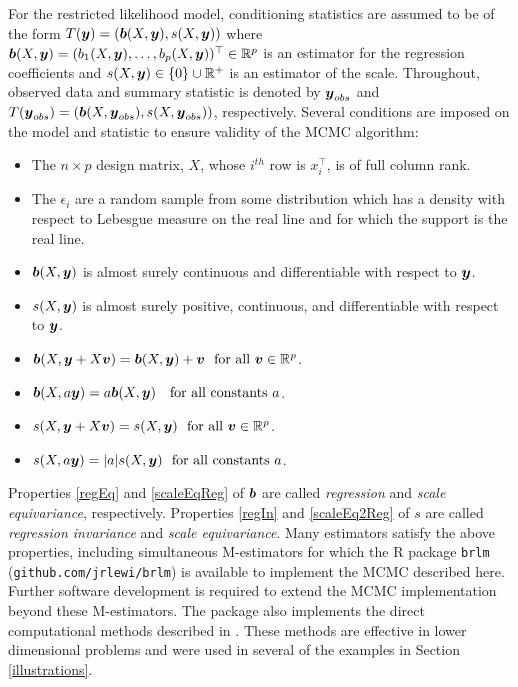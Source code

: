 \documentclass[ba]{imsart}
\makeatletter
\newcommand{\by}{\mbox{\boldmath $y$}}
\newcommand{\bv}{\mbox{\boldmath $v$}}
\newcommand{\bb}{\mbox{\boldmath $b$}}
\newcommand{\green}[1]{{\color{green}#1}}
\newcommand{\labitem}[2]{%
\def\@itemlabel{\textbf{#1}{.}}
\item
\def\@currentlabel{#1}\label{#2}}
\makeatother
\begin{document}
For the restricted likelihood model,  conditioning statistics are assumed to be of the form $T(\by) = (\bb(X, \by), s(X, \by))$ where $\bb(X, \by)= (b_1(X,\by), \dots,b_p(X,\by))^\top\in \mathbb R^{p}$ is an estimator for the regression coefficients and $s(X, \by)\in \{0\} \cup {\mathbb R}^+$ is an estimator of the scale. Throughout, observed data and summary statistic is denoted by $\by_{obs}$ and $T(\by_{obs})=(\bb(X, \by_{obs}), s(X, \by_{obs}))$, respectively. 
Several conditions are imposed on the model and statistic to ensure validity of the MCMC algorithm:
\begin{itemize}
\labitem{C1}{fullRank} The $n \times p$ design matrix, $X$, whose $i^{th}$ row is $x_i^\top$, 
is of full column rank.  
\labitem{C2}{supReal} The $\epsilon_i$ are a random sample from some distribution which has a density with 
respect to Lebesgue measure on the real line and for which the support is the real line.  
\labitem{C3}{asb}$\bb(X,\by)$ is almost surely continuous and differentiable with respect to $\by$.  
\labitem{C4}{as} $s(X,\by)$ is almost surely positive, continuous, and differentiable with respect to $\by$.  
\labitem{C5}{regEq} $\bb(X,\by+X\bv)=\bb(X,\by)+\bv \ \ \text{for  all}\ \bv\in\mathbb{R}^p$. 
\labitem{C6}{scaleEqReg} $\bb(X,a\by)=a\bb(X,\by)\ \ \ \text{for all constants } a$.  
\labitem{C7}{regIn} $s(X,\by+X\bv)=s(X,\by) \ \ \text{for all}\ \bv\in\mathbb{R}^p$.  
\labitem{C8}{scaleEq2Reg} $s(X, a\by)=|a|s(X,\by) \ \ \text{for all constants } a$.  
\end{itemize}
Properties \ref{regEq} and \ref{scaleEqReg} of $\bb$ are called
\textit{regression} and \textit{scale equivariance},
respectively.  Properties \ref{regIn} and \ref{scaleEq2Reg} of $s$ are called \textit{regression invariance}
and \textit{scale equivariance}. 
Many estimators satisfy the above properties, including simultaneous M-estimators \citep{huber2009, maronna2006} for which the R package \texttt{brlm} (\texttt{github.com/jrlewi/brlm}) is available to implement the MCMC described here. Further software development is required to extend the MCMC implementation beyond these M-estimators. The package also implements the direct computational methods described in \cite{lewis2014}. These methods are effective in lower dimensional problems and were used in several of the examples in Section \ref{illustrations}.
\end{document}

